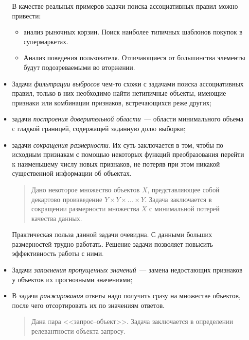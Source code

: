 \begin{itemize}
    В качестве реальных примеров задачи поиска ассоциативных правил можно привести:
    \begin{itemize}
      \item анализ рыночных корзин. Поиск наиболее типичных шаблонов покупок в супермаркетах.
      \item Анализ поведения пользователя. Отличающиеся от большинства элементы будут подозреваемыми во
        вторжении.
    \end{itemize}
    
  \item Задачи \emph{фильтрации выбросов} чем-то схожи с задачами поиска ассоциативных правил, только в
    них необходимо найти нетипичные объекты, имеющие признаки или комбинации признаков, встречающихся
    реже других;
  \item задачи \emph{построения доверительной области}~--- области минимального объема с гладкой
    границей, содержащей заданную долю выборки;
  \item задачи \emph{сокращения размерности}. Их суть заключается в том, чтобы по исходным признакам с
    помощью некоторых функций преобразования перейти к наименьшему числу новых признаков, не потеряв
    при этом никакой существенной информации об объектах.
    
    \begin{quote}
      \vspace*{-1ex}
      Дано некоторое множество объектов \( X \), представляющее собой декартово произведение
      \( Y\times Y\times\ldots\times Y \). Задача заключается в сокращении размерности множества
      \( X \) с минимальной потерей качества данных.
      \vspace*{-1ex}
    \end{quote}
    
    Практическая польза данной задачи очевидна. С данными больших размерностей трудно работать. Решение
    задачи позволяет повысить эффективность работы с ними.
  \item Задачи \emph{заполнения пропущенных значений}~--- замена
    недостающих признаков у объектов их прогнозными значениями;    
  \item В задачи \emph{ранжирования} ответы надо получить сразу на множестве объектов, после чего
    отсортировать их по значениям ответов.
    
    \begin{quote}
      \vspace*{-1ex}
      Дана пара <<запрос--объект>>. Задача заключается в определении релевантности объекта запросу.
      \vspace*{-1ex}
    \end{quote}
    

\end{itemize}
